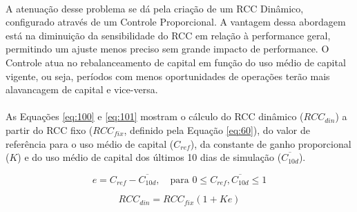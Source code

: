 \paragraph{} A atenuação desse problema se dá pela criação de um RCC Dinâmico, configurado através de um Controle Proporcional. A vantagem dessa abordagem está na diminuição da sensibilidade do RCC em relação à performance geral, permitindo um ajuste menos preciso sem grande impacto de performance. O Controle atua no rebalanceamento de capital em função do uso médio de capital vigente, ou seja, períodos com menos oportunidades de operações terão mais alavancagem de capital e vice-versa.


\paragraph{} As Equações \ref{eq:100} e \ref{eq:101} mostram o cálculo do RCC dinâmico (\begin{math} RCC_{din} \end{math}) a partir do RCC fixo (\begin{math} RCC_{fix} \end{math}, definido pela Equação \ref{eq:60}), do valor de referência para o uso médio de capital (\begin{math} C_{ref} \end{math}), da constante de ganho proporcional (\begin{math} K \end{math}) e do uso médio de capital dos últimos 10 dias de simulação (\begin{math} \overline{C_{10d}} \end{math}).

\begin{equation} \label{eq:100}
    e = C_{ref} - \overline{C_{10d}}, \quad \mbox{para } 0 \le C_{ref}, \overline{C_{10d}} \le 1
\end{equation}

\begin{equation} \label{eq:101}
    RCC_{din} = RCC_{fix} (1 + K e)
\end{equation}

